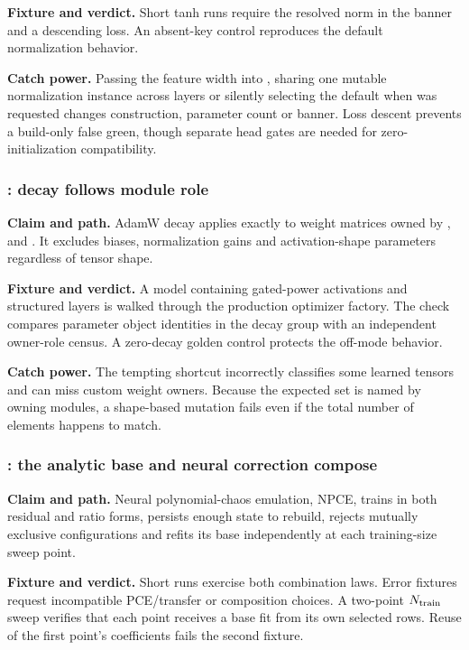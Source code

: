 \textbf{Fixture and verdict.}  Short tanh runs require the resolved norm in
the banner and a descending loss.  An absent-key control reproduces the
default normalization behavior.

\textbf{Catch power.}  Passing the feature width into , sharing
one mutable normalization instance across layers or silently selecting the
default when  was requested changes construction, parameter
count or banner.  Loss descent prevents a build-only false green, though separate
head gates are needed for zero-initialization compatibility.

\subsubsection{: decay follows module role}

\textbf{Claim and path.}  AdamW decay applies exactly to weight matrices owned
by ,  and .  It excludes biases,
normalization gains and activation-shape parameters regardless of tensor
shape.

\textbf{Fixture and verdict.}  A model containing gated-power activations and
structured layers is walked through the production optimizer factory.  The
check compares parameter object identities in the decay group with an
independent owner-role census.  A zero-decay golden control protects the
off-mode behavior.

\textbf{Catch power.}  The tempting shortcut 
incorrectly classifies some learned tensors and can miss custom weight
owners.  Because the expected set is named by owning modules, a shape-based
mutation fails even if the total number of elements happens to match.

\subsubsection{: the analytic base and neural correction compose}

\textbf{Claim and path.}  Neural polynomial-chaos emulation, NPCE, trains in
both residual and ratio forms, persists enough state to rebuild, rejects
mutually exclusive configurations and refits its base independently at each
training-size sweep point.

\textbf{Fixture and verdict.}  Short runs exercise both combination laws.
Error fixtures request incompatible PCE/transfer or composition choices.  A
two-point \(N_{\rm train}\) sweep verifies that each point receives a base fit
from its own selected rows.  Reuse of the first point's coefficients fails the
second fixture.

